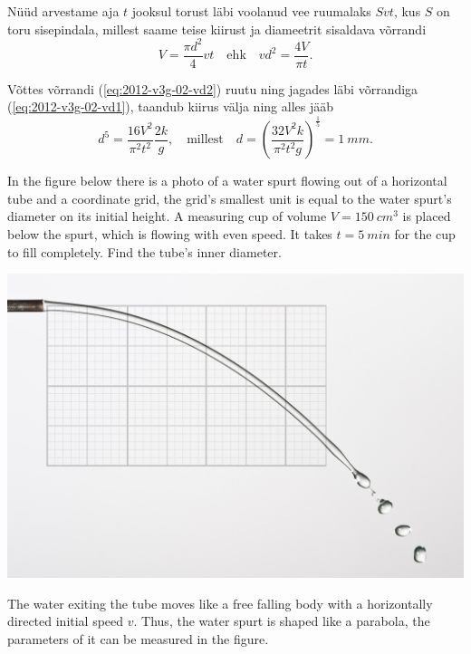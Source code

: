 {Nüüd arvestame aja $t$ jooksul torust läbi voolanud vee ruumalaks $Svt$, kus $S$ on toru sisepindala, millest saame teise kiirust ja diameetrit sisaldava võrrandi
\begin{equation}\label{eq:2012-v3g-02-vd2}
V=\frac{\pi d^2}{4}vt \quad \mathrm{ehk} \quad vd^2=\frac{4V}{\pi t}.
\end{equation}

Võttes võrrandi (\ref{eq:2012-v3g-02-vd2}) ruutu ning jagades läbi võrrandiga (\ref{eq:2012-v3g-02-vd1}), taandub kiirus välja ning alles jääb
\[d^5=\frac{16V^2}{\pi^2t^2}\frac{2k}{g}, \quad \mathrm{millest} \quad d=\left(\frac{32V^2k}{\pi^2 t^2 g}\right)^{\frac{1}{5}}=\SI{1}{mm	}.\]
\fi


\ifEngStatement
In the figure below there is a photo of a water spurt flowing out of a horizontal tube and a coordinate grid, the grid’s smallest unit is equal to the water spurt’s diameter on its initial height. A measuring cup of volume $V=\SI{150}{cm^3}$ is placed below the spurt, which is flowing with even speed.  It takes $t=\SI{5}{min}$ for the cup to fill completely. Find the tube’s inner diameter.
\begin{center}
\includegraphics[width=0.7\linewidth]{2012-v3g-02-jet}%
\end{center}
\fi


\ifEngHint
The water exiting the tube moves like a free falling body with a horizontally directed initial speed $v$. Thus, the water spurt is shaped like a parabola, the parameters of it can be measured in the figure.
\fi


}
